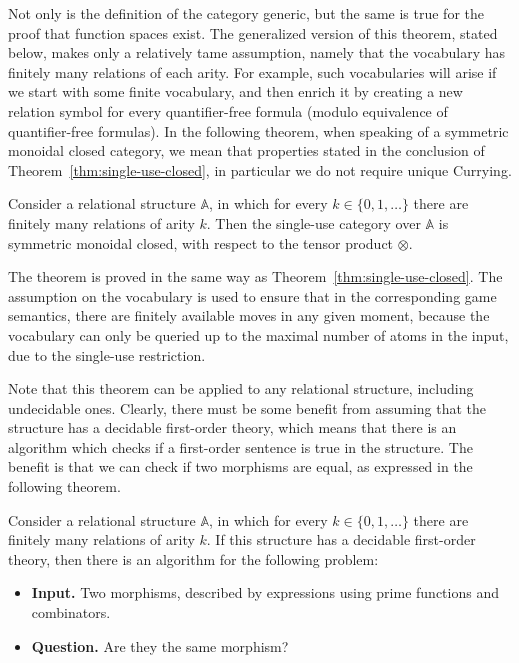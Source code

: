 \documentclass[10pt,a4paper]{amsart}
\numberwithin{equation}{section}
\theoremstyle{plain}
\newcommand{\set}[1]{\{#1\}}
\newcommand{\atoms}{\mathbb A}
\begin{document}
Not only is the definition of the category generic, but the same is true for  the proof that function spaces exist. The generalized version of this theorem, stated below, makes only a relatively tame assumption, namely that the vocabulary has finitely many relations of each arity. For example, such vocabularies will arise if we start with some finite vocabulary, and then enrich it by creating a new relation symbol for every quantifier-free formula (modulo equivalence of quantifier-free formulas). In the following theorem, when speaking of a symmetric monoidal closed category, we mean that properties stated in the conclusion of Theorem~\ref{thm:single-use-closed}, in particular we do not require unique Currying.




\begin{theorem}\label{thm:single-use-closed-relational-structures}
    Consider a relational structure $\atoms$, in which for every $k \in \set{0,1,\ldots}$ there are finitely many relations of arity $k$. Then the single-use category over $\atoms$ is symmetric monoidal closed, with respect to the tensor product $\otimes$.
\end{theorem}


The theorem is proved in the same way as Theorem~\ref{thm:single-use-closed}.  The assumption on the vocabulary is used to ensure that in the corresponding game semantics, there are finitely available moves in any given moment, because the vocabulary can only be queried up to the maximal number of atoms in the input, due to the single-use restriction.

Note that this  theorem can be applied to any relational structure, including undecidable ones. Clearly, there must be some benefit from assuming that the structure has a decidable first-order theory, which means that there is an algorithm which checks if a first-order sentence is true in the structure. 
The benefit is that we can check if two morphisms are equal, as expressed in the following theorem. 


\begin{theorem}\label{thm:first-order-decidable}
    Consider a relational structure $\atoms$, in which for every $k \in \set{0,1,\ldots}$ there are finitely many relations of arity $k$. If this structure has a decidable first-order theory, then there is an algorithm for the following problem:
    \begin{itemize}
        \item {\bf Input.} Two morphisms, described by expressions using prime functions and combinators.
        \item {\bf Question.} Are they the same morphism?
    \end{itemize}
\end{theorem}
\end{document}
